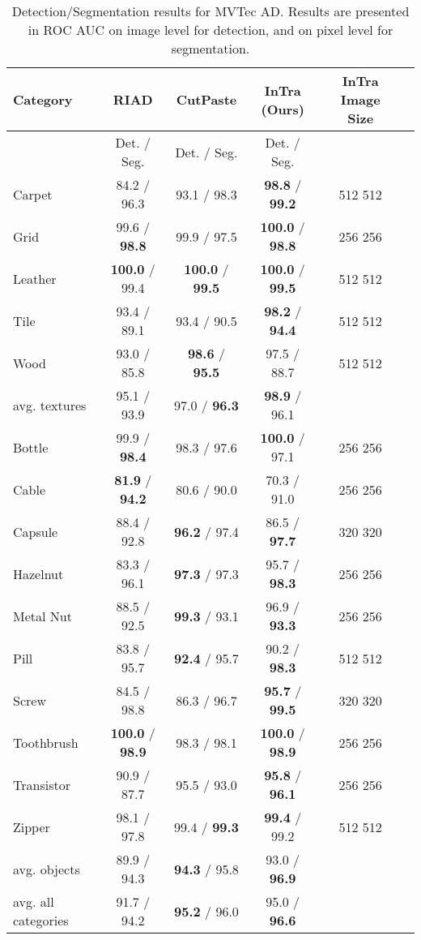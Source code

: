 \documentclass[runningheads]{llncs}
\begin{document}
\begin{table}[t]
	\caption{Detection/Segmentation results for MVTec AD. Results are presented in ROC AUC  on image level for detection, and on pixel level for segmentation.}
	\label{table:results}
	\begin{center}
		\begin{tabular}{l c c c c c}
			\hline
			Category & RIAD \cite{ZAVRTANIK2021107706} & CutPaste \cite{li2021cutpaste} & InTra (Ours) & InTra Image Size \\
			\hline \hline
			& Det. / Seg. & Det. / Seg. & Det. / Seg. & \\
			Carpet & 84.2 / 96.3 & 93.1 / 98.3 & \textbf{98.8} / \textbf{99.2} & 512  512 \\
			Grid & 99.6 / \textbf{98.8} & 99.9 / 97.5 &  \textbf{100.0} / \textbf{98.8} & 256  256 \\
			Leather & \textbf{100.0} / 99.4 & \textbf{100.0} / \textbf{99.5} & \textbf{100.0} / \textbf{99.5} & 512  512  \\
			Tile & 93.4 / 89.1 & 93.4 / 90.5 & \textbf{98.2} / \textbf{94.4} & 512  512 \\
			Wood & 93.0 / 85.8 & \textbf{98.6} / \textbf{95.5} & 97.5 / 88.7 & 512  512 \\
			\hline
			avg. textures & 95.1 / 93.9 & 97.0 / \textbf{96.3} & \textbf{98.9} / 96.1 \\
			\hline
			Bottle & 99.9 / \textbf{98.4} & 98.3 / 97.6 & \textbf{100.0} / 97.1 & 256  256 \\
			Cable & \textbf{81.9} / \textbf{94.2} & 80.6 / 90.0 & 70.3 / 91.0 & 256  256 \\
			Capsule & 88.4 / 92.8 & \textbf{96.2} / 97.4 & 86.5 / \textbf{97.7} & 320  320 \\
			Hazelnut & 83.3 / 96.1 & \textbf{97.3} / 97.3 & 95.7 / \textbf{98.3} & 256  256 \\
			Metal Nut & 88.5 / 92.5 & \textbf{99.3} / 93.1 & 96.9 / \textbf{93.3} & 256  256 \\
			Pill & 83.8 / 95.7 & \textbf{92.4} / 95.7 & 90.2 / \textbf{98.3} & 512  512 \\
			Screw & 84.5 / 98.8 & 86.3 / 96.7 & \textbf{95.7} / \textbf{99.5} & 320  320  \\
			Toothbrush & \textbf{100.0} / \textbf{98.9} & 98.3 / 98.1 & \textbf{100.0} / \textbf{98.9} & 256  256 \\
			Transistor & 90.9 / 87.7 & 95.5 / 93.0 & \textbf{95.8} / \textbf{96.1} & 256  256 \\
			Zipper & 98.1 / 97.8 & 99.4 / \textbf{99.3} & \textbf{99.4} / 99.2 & 512  512 \\
			\hline
			avg. objects & 89.9 / 94.3 & \textbf{94.3} / 95.8 & 93.0 / \textbf{96.9} \\
			\hline
			avg. all categories & 91.7 / 94.2 & \textbf{95.2} / 96.0 & 95.0 / \textbf{96.6} \\
			\hline
		\end{tabular}
	\end{center}
\end{table}
\end{document}
